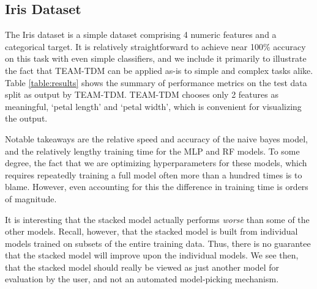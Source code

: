 \documentclass[conference]{IEEEtran}
\begin{document}
\subsection{Iris Dataset} \label{subsection:iris}

The Iris dataset is a simple dataset comprising 4 numeric features and a categorical target.  
 It is relatively straightforward to achieve near 100\% accuracy on this task with even simple classifiers, and we include it primarily to illustrate the fact that TEAM-TDM can be applied as-is to simple and complex tasks alike.
 Table \ref{table:results} shows the summary of performance metrics on the test data split as output by TEAM-TDM.
 TEAM-TDM chooses only 2 features as meaningful, `petal length' and `petal width', which is convenient for visualizing the output.

Notable takeaways are the relative speed and accuracy of the naive bayes model, and the relatively lengthy training time for the MLP and RF models.
 To some degree, the fact that we are optimizing hyperparameters for these models, which requires repeatedly training a full model often more than a hundred times is to blame.
 However, even accounting for this the difference in training time is orders of magnitude.

It is interesting that the stacked model actually performs \emph{worse} than some of the other models.
 Recall, however, that the stacked model is built from individual models trained on subsets of the entire training data.
 Thus, there is no guarantee that the stacked model will improve upon the individual models.
 We see then, that the stacked model should really be viewed as just another model for evaluation by the user, and not an automated model-picking mechanism. 
\end{document}
